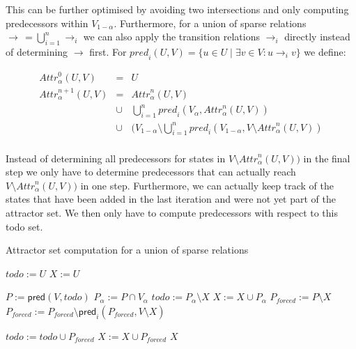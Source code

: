 \documentclass{article}
\newcommand{\var}[1]{\ensuremath{\textit{#1}}}
\newcommand{\attrsym}{\ensuremath{\textit{Attr}}}
\newcommand{\attr}[3][]{\ensuremath{\attrsym^{#1}_{#2}(#3)}}
\newcommand{\pred}{\ensuremath{\textit{pred}}}
\begin{document}
This can be further optimised by avoiding two intersections and only computing predecessors within $V_{1 - \alpha}$. 
Furthermore, for a union of sparse relations $\rightarrow \,= \bigcup_{i=1}^{n} \rightarrow_i$ we can also apply the transition relations $\rightarrow_i$ directly instead of determining $\rightarrow$ first.
For $\pred_i(U, V) = \{ u \in U \mid \exists v \in V: u \rightarrow_i v \}$ we define:

\[
\begin{array}{lcl}
\attr[0]{\alpha}{U, V} & = & U \\
\attr[n+1]{\alpha}{U, V} & = & \attr[n]{\alpha}{U, V} \\
      & \cup & \bigcup_{i=1}^{n} \pred_i(V_{\alpha}, \attr[n]{\alpha}{U, V}) \\
      & \cup & (V_{1 - \alpha} \setminus \bigcup_{i=1}^{n} \pred_i(V_{1 - \alpha}, V \setminus \attr[n]{\alpha}{U,V}) \\
\end{array}
\]

Instead of determining all predecessors for states in $V \setminus \attr[n]{\alpha}{U,V})$ in the final step we only have to determine predecessors that can actually reach $V \setminus \attr[n]{\alpha}{U,V})$ in one step.
Furthermore, we can actually keep track of the states that have been added in the last iteration and were not yet part of the attractor set.
We then only have to compute predecessors with respect to this todo set.

\begin{algorithm}[h]
\caption{Attractor set computation for a union of sparse relations}
\label{alg:attractor_set}
\begin{algorithmic}[1]
\State $\var{todo} := U$
\State $\var{X} := U$

\While {$\var{todo} \neq \emptyset$}
  \State $P := \textsf{pred}(V, todo)$
  \State $P_\alpha := P \cap V_\alpha$
  \State $\var{todo} := P_\alpha \setminus X$
  \State $X := X \cup P_\alpha$
  \State $P_\textit{forced} := P \setminus X$
    \State $P_\textit{forced} := P_\textit{forced} \setminus \textsf{pred}_i(P_\textit{forced}, V \setminus X)$
  
  \EndFor
  \State $\var{todo} := \var{todo} \cup P_\textit{forced}$
  \State $X := X \cup P_\textit{forced}$
\EndWhile
\State \Return \var{X}
\EndFunction
\end{algorithmic}
\end{algorithm}
\end{document}
